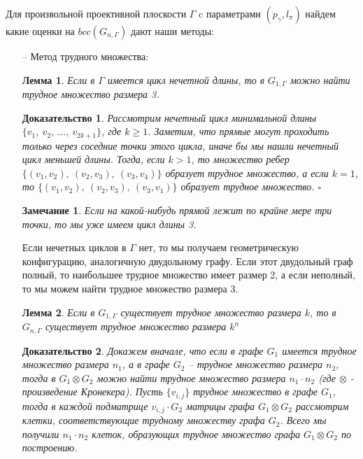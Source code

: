 \documentclass[a4paper]{article}
\newtheorem*{mremark}{Замечание}
\newtheorem*{mlemma}{Лемма}
\newtheorem*{msolution}{Доказательство}
\begin{document}
Для произвольной проективной плоскости $\Gamma$ c параметрами $(p_{\gamma}, l_{\pi})$ найдем какие 
оценки на $bcc(G_{n,\Gamma})$ дают наши методы:

\begin{itemize}[noitemsep]
    \item[--] Метод трудного множества:
    \begin{mlemma}
        Если в $\Gamma$ имеется цикл нечетной длины, то в $G_{1, \Gamma}$ можно найти трудное множество 
        размера 3.
    \end{mlemma}
    \begin{msolution}
        Рассмотрим нечетный цикл минимальной длины $\{v_1,\ v_2,\ \ldots,\ v_{2k+1}\}$, где $k \geq 1$.
        Заметим, что прямые могут проходить только через соседние точки этого цикла, иначе бы мы нашли 
        нечетный цикл меньшей длины. Тогда, если $k > 1$, то множество ребер $\{(v_1, v_2),\ (v_2, v_3),
        \ (v_3, v_4)\}$ образует трудное множество, а если $k = 1$, то $\{(v_1, v_2),\ (v_2, v_3),
        \ (v_3, v_1)\}$ образует трудное множество. $\square$
    \end{msolution}
    
    \begin{mremark}
        Если на какой-нибудь прямой лежит по крайне мере три точки, то мы уже имеем цикл длины 3.
    \end{mremark}

     Если нечетных циклов в $\Gamma$ нет, то мы получаем геометрическую конфигурацию, аналогичную 
     двудольному графу. Если этот двудольный граф полный, то наибольшее трудное множество имеет размер 2, 
     а если неполный, то мы можем найти трудное множество размера 3.
     
     \begin{mlemma}
         Если в $G_{1, \Gamma}$ существует трудное множество размера $k$, то в $G_{n, \Gamma}$ 
         существует трудное множество размера $k^n$
     \end{mlemma}
     \begin{msolution}
        Докажем вначале, что если в графе $G_1$ имеется трудное множество размера $n_1$, а в графе 
        $G_2$ -- трудное множество размера $n_2$, тогда в $G_1 \otimes G_2$ можно найти трудное 
        множество размера $n_1\cdot n_2$ (где $\otimes$ - произведение Кронекера). Пусть $\{v_{i,j}\}$ 
        трудное множество в графе $G_1$, тогда в каждой подматрице $v_{i, j}\cdot G_2$ матрицы 
        графа $G_1 \otimes G_2$ рассмотрим клетки, соответствующие трудному множеству графа $G_2$. 
        Всего мы получили $n_1\cdot n_2$ клеток, образующих трудное множество графа $G_1 \otimes G_2$ 
        по построению.
        

\end{msolution}
\end{itemize}
\end{document}

